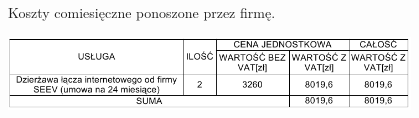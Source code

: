 \documentclass{report}
\begin{document}
\begin{table}[H]
\caption{Koszty comiesięczne ponoszone przez firmę.}
\label{table:koszty_loncze}
 \centering
      \includegraphics[width=0.8\textwidth]{./obrazki/koszty/koszty_loncze.png}
\end{table}





 
\end{document}
